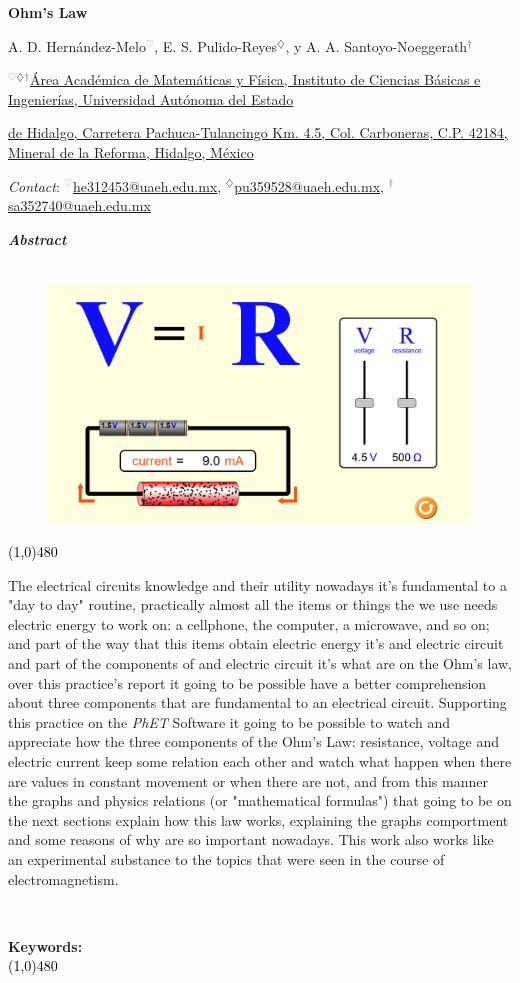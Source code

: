 \documentclass[a4paper,10pt]{article}
\makeatletter
\newcounter{resumen}
\newenvironment{resumen}
{	\begin{center}
	\begin{minipage}[t!]{480 pt}
	\vspace{2mm}
	\emph{\textcolor{MiColor1}{\textbf{Abstract}}}
	\\[-1mm]
	\\[-10mm]
	\hfill 
	   \begin{figure}
       \centering
       \includegraphics[scale=0.2]{Images/Ohm's Law.PNG}
       \end{figure} \vspace{-4.8mm}
    \hfill
	\textcolor{Black}{\line(1,0){480}}\\ \par
}
{
	\par \normalsize \par
	\par \\[3mm] \par
	\vspace{4mm}
	\par \footnotesize\textbf{Keywords: \footnotesize\@palabras}
	\\[-1mm]
	\textcolor{Black}{\line(1,0){480}}\\ \par
	\\[5cm]
	\end{minipage}
	\vspace{0.5cm}
	\end{center}
}
\makeatother
\begin{document}
{\textbf{\LARGE Ohm's Law} \par} \vspace{3mm}
{\small A. D. Hernández-Melo\textcolor{Plum}{$^\heartsuit$}, E. S. Pulido-Reyes\textcolor{ProcessBlue}{$^\diamondsuit$}, y A. A. Santoyo-Noeggerath\textcolor{Green}{$^\dagger$} \par} \vspace{3mm}
{\footnotesize \textcolor{Plum}{$^\heartsuit$}\textcolor{ProcessBlue}{$^\diamondsuit$}\textcolor{Green}{$^\dagger$}\protect\href{https://www.google.com/maps/place/\%C3\%81rea+Acad\%C3\%A9mica+de+Matem\%C3\%A1ticas+y+F\%C3\%ADsica,+Universidad+Aut\%C3\%B3noma+del+Estado+de+Hidalgo,+Universidad+Autonoma+del+Estado+de+Hidalgo/@20.0934375,-98.7104375,17z/data=!4m13!1m7!3m6!1s0x0:0x0!2s76G337VQ\%2B9R!3b1!8m2!3d20.0934375!4d-98.7104375!3m4!1s0x85d1a773691bc455:0xe552799fa3ca76a5!8m2!3d20.0933901!4d-98.7104677}{Área Académica de Matemáticas y Física, Instituto de Ciencias Básicas e Ingenierías, Universidad Autónoma del Estado} \par} 
{\footnotesize \protect\href{https://www.google.com/maps/place/\%C3\%81rea+Acad\%C3\%A9mica+de+Matem\%C3\%A1ticas+y+F\%C3\%ADsica,+Universidad+Aut\%C3\%B3noma+del+Estado+de+Hidalgo,+Universidad+Autonoma+del+Estado+de+Hidalgo/@20.0934375,-98.7104375,17z/data=!4m13!1m7!3m6!1s0x0:0x0!2s76G337VQ\%2B9R!3b1!8m2!3d20.0934375!4d-98.7104375!3m4!1s0x85d1a773691bc455:0xe552799fa3ca76a5!8m2!3d20.0933901!4d-98.7104677}{de Hidalgo, Carretera Pachuca-Tulancingo Km. 4.5, Col. Carboneras, C.P. 42184, Mineral de la Reforma, Hidalgo, México} \par}
{\footnotesize \textit{Contact}: \textcolor{Plum}{$^\heartsuit$}\protect\href{mailto:he312453@uaeh.edu.mx}{he312453@uaeh.edu.mx},  \textcolor{ProcessBlue}{$^\diamondsuit$}\protect\href{mailto:pu359528@uaeh.edu.mx}{pu359528@uaeh.edu.mx}, \textcolor{Green}{$^\dagger$}\protect\href{mailto:sa352740@uaeh.edu.mx}{sa352740@uaeh.edu.mx}}

\begin{resumen}
The electrical circuits knowledge and their utility nowadays it's fundamental to a "day to day" routine, practically almost all the items or things the we use needs electric energy to work on: a cellphone, the computer, a microwave, and so on; and part of the way that this items obtain electric energy it's and electric circuit and part of the components of and electric circuit it's what are on the Ohm's law, over this practice's report it going to be possible have a better comprehension about three components that are fundamental to an electrical circuit.
Supporting this practice on the \textit{PhET} Software it going to be possible to watch and appreciate how the three components of the Ohm's Law: resistance, voltage and electric current keep some relation each other and watch what happen when there are values in constant movement or when there are not, and from this manner the graphs and physics relations (or "mathematical formulas") that going to be on the next sections explain how this law works, explaining the graphs comportment and some reasons of why are so important nowadays. This work also works like an experimental substance to the topics that were seen in the course of electromagnetism.
\end{resumen}
\end{document}
